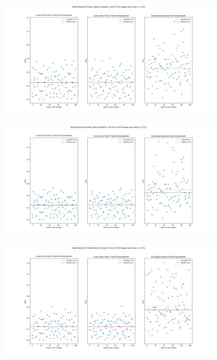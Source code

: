 \documentclass[aps,pra,a4paper,nofootinbib,onecolumn,tightenlines,longbibliography,12pt,amsfonts,amssymb,amsmath,floatfix]{revtex4-2} %
\begin{document}
    \begin{figure}[H]
      \begin{center}
        \includegraphics[width=1.0\textwidth]{project_pics/error_r2.png}
      \end{center}
      \caption{}
      \label{fig:tri_er_r2}
    \end{figure}
    
    \begin{figure}[H]
      \begin{center}
        \includegraphics[width=1.0\textwidth]{project_pics/error_r283.png}
      \end{center}
      \caption{}
      \label{fig:tri_er_r283}
    \end{figure}
    
    \begin{figure}[H]
      \begin{center}
        \includegraphics[width=1.0\textwidth]{project_pics/error_r4.png}
      \end{center}
      \caption{}
      \label{fig:tri_er_r4}
    \end{figure}
    
\end{document}
